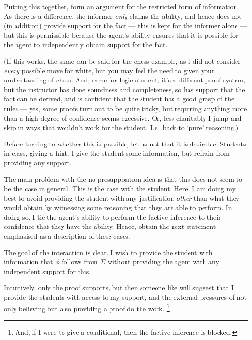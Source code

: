 \documentclass[10pt]{article}
\begin{document}
Putting this together, form an argument for the restricted form of information.
As there is a difference, the informer \emph{only} claims the ability, and hence does not (in addition) provide support for the fact --- this is kept for the informer alone --- but this is permissible because the agent's ability ensures that it is possible for the agent to independently obtain support for the fact.

(If this works, the same can be said for the chess example, as I did not consider \emph{every} possible move for white, but you may feel the need to given your understanding of chess.
And, same for logic student, it's a different proof system, but the instructor has done soundness and completeness, so has support that the fact can be derived, and is confident that the student has a good grasp of the rules --- yes, some proofs turn out to be quite tricky, but requiring anything more than a high degree of confidence seems excessive.
Or, less charitably I jump and skip in ways that wouldn't work for the student.
I.e.\ back to `pure' reasoning.)

Before turning to whether this is possible, let us not that it is desirable.
Students in class, giving a hint.
I give the student some information, but refrain from providing any support.

\begin{note}[Student]
  The main problem with the no presupposition idea is that this does not seem to be the case in general.
  This is the case with the student.
  Here, I am doing my best to avoid providing the student with any justification \emph{other} than what they would obtain by witnessing some reasoning that they are able to perform.
  In doing so, I tie the agent's ability to perform the factive inference to their confidence that they have the ability.
  Hence, obtain the next statement emphasised as a description of these cases.
\end{note}

The goal of the interaction is clear.
I wish to provide the student with information that \(\phi\) follows from \(\Sigma\) without providing the agent with any independent support for this.

Intuitively, only the proof supports, but then someone like \citeauthor{Owens:2006tw} will suggest that I provide the students with access to my support, and the external pressures of not only believing but also providing a proof do the work.\nolinebreak
\footnote{
  And, if I were to give a conditional, then the factive inference is blocked.
}
\end{document}

